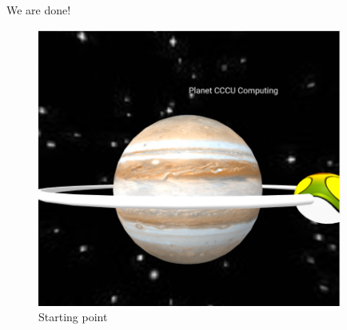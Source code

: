We are done!

\begin{figure}
    \centering
    \includegraphics[width=10cm]{chapters/chapter2/figures/planet3.png}
    \caption{Starting point}
    \label{fig:Planet3}
\end{figure}